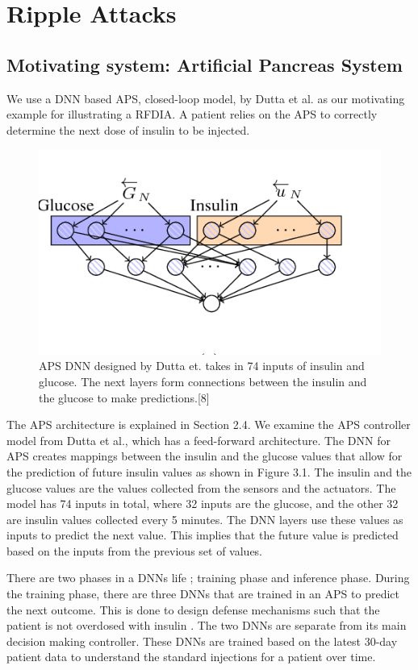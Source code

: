 \chapter{Ripple Attacks}
\label{ch:Chapter2}

\section{Motivating system: Artificial Pancreas System}

We use a DNN based \ac{APS}, closed-loop model, by Dutta et al. \cite{10.1007/978-3-319-99429-1_11}  as our motivating example for illustrating a \ac{RFDIA}. 
A patient relies on  the APS to correctly determine the next dose of insulin to be injected. 

\begin{figure}
	\centering
	\includegraphics[width=0.7\linewidth, height=0.3\linewidth]{Images/APSDNN}
	\caption[APS DNN]{APS DNN designed by Dutta et. takes in 74 inputs of insulin and glucose. The next layers form connections between the insulin and the glucose to make predictions.[8]}
	\label{fig:apsdnn}
\end{figure}

The APS architecture is explained in Section 2.4. 
We examine the \ac{APS} controller model from Dutta et al., which has a feed-forward architecture. 
The DNN for APS creates mappings between the insulin and the glucose values that allow for the prediction of future insulin values as shown in Figure 3.1. 
The insulin and the glucose values are the values collected from the sensors and the actuators. 
The model has 74 inputs in total, where 32 inputs are the glucose, and the other 32  are insulin values collected every 5 minutes.
 The DNN layers use these values as inputs to predict the next value. 
 This implies that the future value is predicted based on the inputs from the previous set of values. 


There are two phases in a \ac{DNN}s life ; training phase and inference phase. 
During the training phase, there are three \ac{DNN}s that are trained in an \ac{APS} to predict the next outcome. 
This is done to design defense mechanisms such that the patient is not overdosed with insulin .  
The two \ac{DNN}s are separate from its main decision making controller. 
These \ac{DNN}s are trained based on the latest 30-day patient data to understand the standard injections for a patient over time. 


